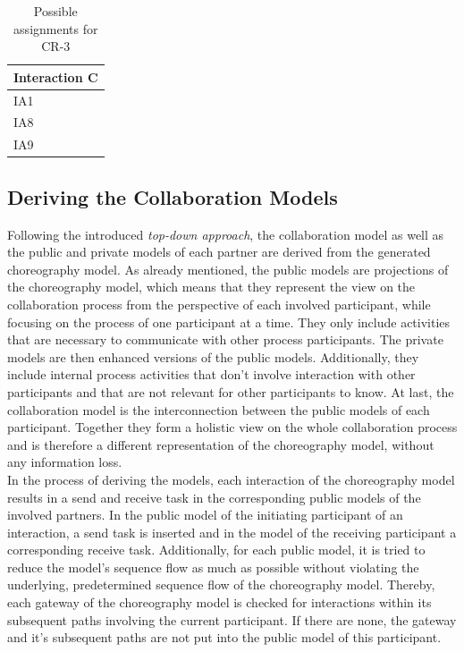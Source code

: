 \begin{table}[H]
\centering
\begin{tabular}{l}
Interaction C \\ \hline
IA1 \\
IA8 \\
IA9 \\ \hline
\end{tabular}
\caption{Possible assignments for CR-3}
\label{tbl:crAssignment3}
\end{table}

\subsection{Deriving the Collaboration Models}

Following the introduced \textit{top-down approach}, the collaboration model as well as the public and private models of each partner are derived from the generated choreography model. As already mentioned, the public models are projections of the choreography model, which means that they represent the view on the collaboration process from the perspective of each involved participant, while focusing on the process of one participant at a time. They only include activities that are necessary to communicate with other process participants. The private models are then enhanced versions of the public models. Additionally, they include internal process activities that don't involve interaction with other participants and that are not relevant for other participants to know. At last, the collaboration model is the interconnection between the public models of each participant. Together they form a holistic view on the whole collaboration process and is therefore a different representation of the choreography model, without any information loss.\\
In the process of deriving the models, each interaction of the choreography model results in a send and receive task in the corresponding public models of the involved partners. In the public model of the initiating participant of an interaction, a send task is inserted and in the model of the receiving participant a corresponding receive task. Additionally, for each public model, it is tried to reduce the model's sequence flow as much as possible without violating the underlying, predetermined sequence flow of the choreography model. Thereby, each gateway of the choreography model is checked for interactions within its subsequent paths involving the current participant. If there are none, the gateway and it's subsequent paths are not put into the public model of this participant.\\  


